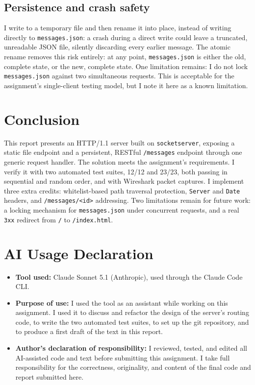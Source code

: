 \documentclass[conference]{IEEEtran}
\begin{document}
\subsection{Persistence and crash safety}\label{Subsection:disc_persistence}
I write to a temporary file and then rename it into place, instead of
writing directly to \texttt{messages.json}: a crash during a direct write
could leave a truncated, unreadable JSON file, silently discarding every
earlier message. The atomic rename removes this risk entirely: at any
point, \texttt{messages.json} is either the old, complete state, or the
new, complete state. One limitation remains: I do not lock
\texttt{messages.json} against two simultaneous requests. This is
acceptable for the assignment's single-client testing model, but I note
it here as a known limitation.

\section{Conclusion}\label{Section:Conclusion}
This report presents an HTTP/1.1 server built on \texttt{socketserver},
exposing a static file endpoint and a persistent, RESTful
\texttt{/messages} endpoint through one generic request handler. The
solution meets the assignment's requirements. I verify it with two
automated test suites, 12/12 and 23/23, both passing in sequential and
random order, and with Wireshark packet captures. I implement three extra
credits: whitelist-based path traversal protection, \texttt{Server} and
\texttt{Date} headers, and \texttt{/messages/<id>} addressing. Two
limitations remain for future work: a locking mechanism for
\texttt{messages.json} under concurrent requests, and a real \texttt{3xx}
redirect from \texttt{/} to \texttt{/index.html}.

\section*{AI Usage Declaration}
\begin{itemize}
	\item \textbf{Tool used:} Claude Sonnet 5.1 (Anthropic), used through the
	Claude Code CLI.
	\item \textbf{Purpose of use:} I used the tool as an assistant while
	working on this assignment. I used it to discuss and refactor the design
	of the server's routing code, to write the two automated test suites, to
	set up the git repository, and to produce a first draft of the text in
	this report.
	\item \textbf{Author's declaration of responsibility:} I reviewed, tested,
	and edited all AI-assisted code and text before submitting this
	assignment. I take full responsibility for the correctness, originality,
	and content of the final code and report submitted here.
\end{itemize}

\printbibliography
\end{document}
